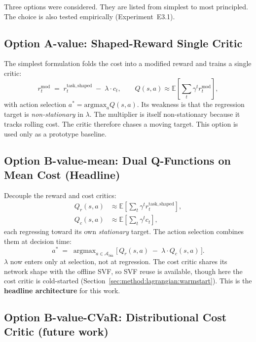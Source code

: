 \documentclass[11pt,a4paper]{report}
\begin{document}
Three options were considered. They are listed from simplest to most
principled. The choice is also tested empirically (Experiment~E3.1).

\subsection{Option A-value: Shaped-Reward Single Critic}
\label{sec:method:lagrangian:A}

The simplest formulation folds the cost into a modified reward and
trains a single critic:
\begin{equation}
  r^{\mathrm{mod}}_t \;=\; r^{\mathrm{task,shaped}}_t \;-\; \lambda \cdot c_t,
  \qquad
  Q(s,a) \approx \mathbb{E}\!\left[\sum_t \gamma^t r^{\mathrm{mod}}_t\right],
  \label{eq:option-A}
\end{equation}
with action selection $a^* = \mathrm{argmax}_a Q(s,a)$. Its weakness is
that the regression target is \emph{non-stationary} in $\lambda$.
The multiplier is itself non-stationary because it tracks rolling
cost. The critic therefore chases a moving target. This option is used
only as a prototype baseline.

\subsection{Option B-value-mean: Dual Q-Functions on Mean Cost (Headline)}
\label{sec:method:lagrangian:Bmean}

Decouple the reward and cost critics:
\begin{align}
  Q_r(s,a) &\approx \mathbb{E}\!\left[\sum_t \gamma^t r^{\mathrm{task,shaped}}_t\right], \\
  Q_c(s,a) &\approx \mathbb{E}\!\left[\sum_t \gamma^t c_t\right],
\end{align}
each regressing toward its own \emph{stationary} target. The action
selection combines them at decision time:
\begin{equation}
  a^* \;=\; \mathop{\mathrm{argmax}}_{a \in \mathcal{A}_{\mathrm{bin}}}
  \Big[\,Q_r(s,a) \;-\; \lambda \cdot Q_c(s,a)\,\Big].
  \label{eq:Bmean-select}
\end{equation}
$\lambda$ now enters only at selection, not at regression. The
cost critic shares its network shape with the offline SVF, so SVF
reuse is available, though here the cost critic is cold-started
(Section~\ref{sec:method:lagrangian:warmstart}). This is the
\textbf{headline architecture} for this work.


\subsection{Option B-value-CVaR: Distributional Cost Critic (future work)}
\label{sec:method:lagrangian:Bcvar}
\end{document}

